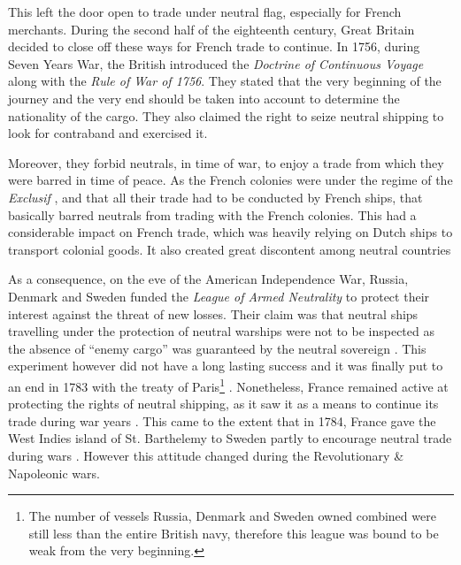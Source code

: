 \documentclass[12pt,a4paper,notitlepage,english]{article}
\begin{document}
\begin{appendix}
This left the door open to trade under neutral flag, especially for French merchants. 
During the second half of the eighteenth century, Great Britain decided to close off these ways for French trade to continue. 
In 1756, during Seven Years War, the British introduced the \textit{Doctrine of Continuous Voyage} along with the \textit{Rule of War of 1756}.
They stated that the very beginning of the journey and the very end should be taken into account to determine the nationality of the cargo. They also claimed the right to seize neutral shipping to look for contraband and exercised it.

Moreover, they forbid neutrals, in time of war, to enjoy a trade from which they were barred in time of peace. 
As the French colonies were under the regime of the \textit{Exclusif} \citep{Tarrade1972}, and that all their trade had to be conducted by French ships, that basically barred neutrals from trading with the French colonies.
This had a considerable impact on French trade, which was heavily relying on Dutch ships to transport colonial goods.
It also created great discontent among neutral countries




As a consequence, on the eve of the American Independence War, Russia, Denmark and Sweden funded the \textit{League of Armed Neutrality} to protect their interest against the threat of new losses.
Their claim was that neutral ships travelling under the protection of neutral warships were not to be inspected as the absence of ``enemy cargo'' was guaranteed by the neutral sovereign \cite[p. 121-125]{Schnakenbourg2013}.
This experiment however did not have a long lasting success and it was finally put to an end in 1783 with the treaty of Paris\footnote{The number of vessels Russia, Denmark and Sweden owned combined were still less than the entire British navy, therefore this league was bound to be weak from the very beginning.} \citep{Griffiths1971}.
Nonetheless, France remained active at protecting the rights of neutral shipping, as it saw it as a means to continue its trade during war years \cite[p. 129]{Schnakenbourg2013}.
This came to the extent that in 1784, France gave the West Indies island of St. Barthelemy to Sweden partly to encourage neutral trade during wars \cite[p. 326]{Schnakenbourg2013}.
However this attitude changed during the Revolutionary \& Napoleonic wars.


\end{appendix}
\end{document}
